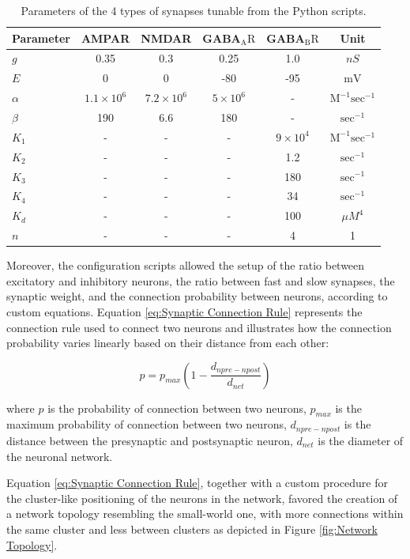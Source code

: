 \begin{table}[!ht]
\centering
\small
\tabcolsep=0.11cm
\begin{tabular}{lccccc}
\hline Parameter & AMPAR & NMDAR & GABA$_{\mathrm{A}} \mathrm{R}$ & GABA$_{\mathrm{B}} \mathrm{R}$ & Unit \\
\hline$g$ & 0.35 & 0.3 & 0.25 & 1.0 & $n S$ \\
$E$ & 0 & 0 & -80 & -95 & $\mathrm{mV}$ \\
$\alpha$ & $1.1 \times 10^6$ & $7.2 \times 10^6$ & $5 \times 10^6$ & - & $\mathrm{M}^{-1} \mathrm{sec}^{-1}$ \\
$\beta$ & 190 & 6.6 & 180 & - & $\mathrm{sec}^{-1}$ \\
$K_1$ & - & - & - & $9 \times 10^4$ & $\mathrm{M}^{-1} \mathrm{sec}^{-1}$ \\
$K_2$ & - & - & - & 1.2 & $\mathrm{sec}^{-1}$ \\
$K_3$ & - & - & - & 180 & $\mathrm{sec}^{-1}$ \\
$K_4$ & - & - & - & 34 & $\mathrm{sec}^{-1}$ \\
$K_d$ & - & - & - & 100 & $\mu M^4$ \\
$n$ & - & - & - & 4 & 1 \\
\hline
\end{tabular}
\caption{Parameters of the 4 types of synapses tunable from the Python scripts.}
\label{tab:Synapses Parameters}
\end{table}

Moreover, the configuration scripts allowed the setup of the ratio between excitatory and inhibitory neurons, the ratio between fast and slow synapses, the synaptic weight, and the connection probability between neurons, according to custom equations. Equation \ref{eq:Synaptic Connection Rule} represents the connection rule used to connect two neurons and illustrates how the connection probability varies linearly based on their distance from each other:

\begin{equation}
p = p_{max} (1-\frac{d_{npre-npost}}{d_{net}})
\label{eq:Synaptic Connection Rule}
\end{equation}

where $p$ is the probability of connection between two neurons, $p_{max}$ is the maximum probability of connection between two neurons, $d_{npre-npost}$ is the distance between the presynaptic and postsynaptic neuron, $d_{net}$ is the diameter of the neuronal network. 

Equation \ref{eq:Synaptic Connection Rule}, together with a custom procedure for the cluster-like positioning of the neurons in the network, favored the creation of a network topology resembling the small-world one, with more connections within the same cluster and less between clusters as depicted in Figure \ref{fig:Network Topology}.

